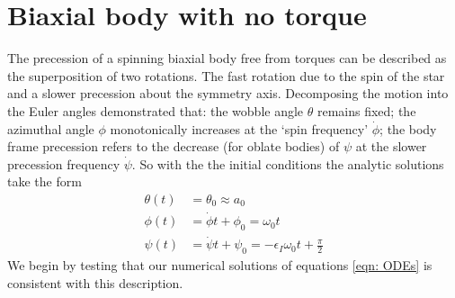 \documentclass[/home/greg/Thesis/main/main.tex]{subfiles}
\begin{document}
\section{Biaxial body with no torque}

The precession of a spinning biaxial body free from torques can be described as
the superposition of two rotations.  The fast rotation due to the spin of the
star and a slower precession about the symmetry axis. Decomposing the motion
into the Euler angles \citet{Jones2001} demonstrated that: the wobble angle
$\theta$ remains fixed; the azimuthal angle $\phi$ monotonically increases at
the `spin frequency' $\dot{\phi}$; the body frame precession refers to the
decrease (for oblate bodies) of $\psi$ at the slower precession frequency
$\dot{\psi}$. So with the the initial conditions the analytic solutions take
the form
\begin{align}
    \theta(t) & = \theta_{0} \approx a_{0} \\
    \phi(t) & = \dot{\phi}t + \phi_{0} = \omega_{0} t \\
    \psi(t) & = \dot{\psi}t + \psi_{0}= -\epsilon_{I}\omega_{0}t+\frac{\pi}{2} 
    \label{eqn: euler angles torque free evolution}
\end{align}
We begin by testing that our numerical solutions of equations
\eqref{eqn: ODEs} is consistent with this description.

\end{document}
